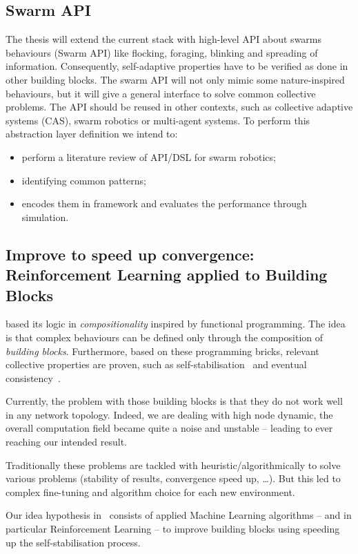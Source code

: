 \documentclass[11pt]{article}
\begin{document}
\subsection{Swarm API}
The thesis will extend the current \ac{} stack with high-level API about swarms behaviours (Swarm API) like flocking, foraging, blinking and spreading of information. Consequently, self-adaptive properties have to be verified as done in other building blocks.  The swarm API will not only mimic some nature-inspired behaviours, but it will give a general interface to solve common collective problems. The API should be reused in other contexts, such as collective adaptive systems (CAS), swarm robotics or multi-agent systems.
To perform this abstraction layer definition we intend to:
\begin{itemize}
	\item perform a literature review of API/DSL for swarm robotics;
	\item identifying common patterns;
	\item encodes them in \ac{} framework and evaluates the performance through simulation.
\end{itemize}
\subsection{Improve to speed up convergence: Reinforcement Learning applied to Building Blocks}
\ac{} based its logic in \textit{compositionality} inspired by functional programming. The idea is that complex behaviours can be defined only through the composition of \emph{building blocks}. Furthermore, based on these programming bricks, relevant collective properties are proven, such as self-stabilisation~\cite{DBLP:journals/corr/abs-1711-08297} and eventual consistency~\cite{DBLP:conf/saso/BealVPD16}. 

Currently, the problem with those building blocks is that they do not work well in any network topology. Indeed, we are dealing with high node dynamic, the overall computation field became quite a noise and unstable -- leading to ever reaching our intended result.

Traditionally these problems are tackled with heuristic/algorithmically to solve various problems (stability of results, convergence speed up, \dots{}). But this led to complex fine-tuning and algorithm choice for each new environment.

Our idea hypothesis in~\cite{research} consists of applied Machine Learning algorithms -- and in particular Reinforcement Learning -- to improve building blocks using speeding up the self-stabilisation process.
\end{document}
